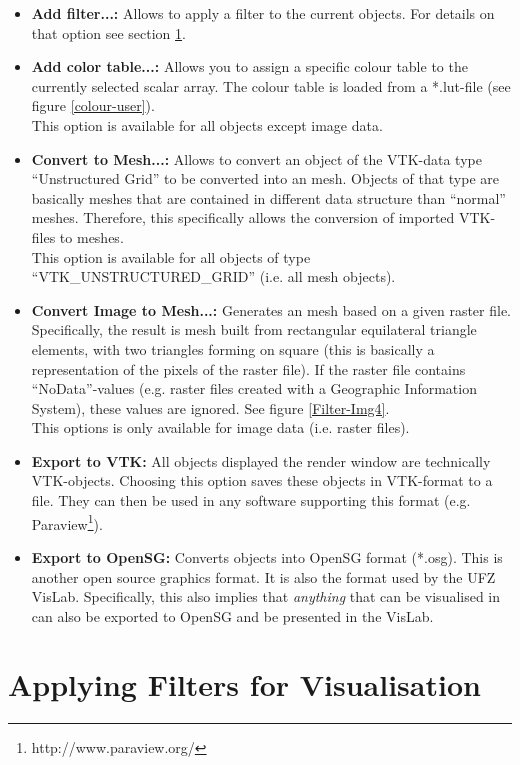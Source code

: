 \begin{itemize}
\item \textbf{Add filter...:} Allows to apply a filter to the current objects. For details on that option see section \ref{filters}.
\item \textbf{Add color table...:} Allows you to assign a specific colour table to the currently selected scalar array. The colour table is loaded from a *.lut-file (see figure \ref{colour-user}).\\
    This option is available for all objects except image data.
\item \textbf{Convert to Mesh...:} Allows to convert an object of the VTK-data type ``Unstructured Grid'' to be converted into an \ogs mesh. Objects of that type are basically meshes that are contained in different data structure than ``normal'' \ogs meshes. Therefore, this specifically allows the conversion of imported VTK-files to \ogs meshes.\\
    This option is available for all objects of type ``VTK\_UN\-STRUCT\-URED\_GRID'' (i.e. all mesh objects).
\item \textbf{Convert Image to Mesh...:} Generates an \ogs mesh based on a given raster file. Specifically, the result is mesh built from rectangular equilateral triangle elements, with two triangles forming on square (this is basically a representation of the pixels of the raster file). If the raster file contains ``NoData''-values (e.g. raster files created with a Geographic Information System), these values are ignored. See figure \ref{Filter-Img4}.\\
    This options is only available for image data (i.e. raster files).
\item \textbf{Export to VTK:} All objects displayed the render window are technically VTK-objects. Choosing this option saves these objects in VTK-format to a file. They can then be used in any software supporting this format (e.g. Paraview\footnote{http://www.paraview.org/}).
\item \textbf{Export to OpenSG:} Converts objects into OpenSG format (*.osg). This is another open source graphics format. It is also the format used by the UFZ VisLab. Specifically, this also implies that \emph{anything} that can be visualised in \ogs can also be exported to OpenSG and be presented in the VisLab.
\end{itemize}

\section{Applying Filters for Visualisation}
\label{filters}

